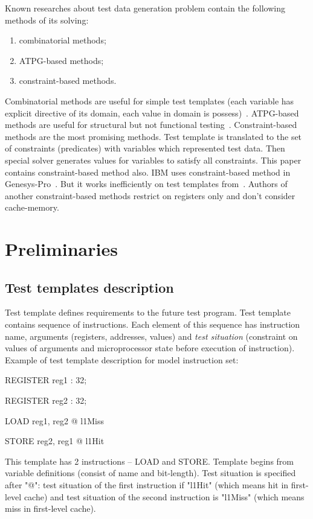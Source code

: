 \documentclass[times, 10pt,twocolumn]{article}
\begin{document}
Known researches about test data generation problem contain the
following methods of its solving:
\begin{enumerate}
\item combinatorial methods;
\item ATPG-based methods;
\item constraint-based methods.
\end{enumerate}

Combinatorial methods are useful for simple test templates (each
variable has explicit directive of its domain, each value in domain
is possess)~\cite{combinatorial}. ATPG-based methods are useful for
structural but not functional testing~\cite{ATPG}. Constraint-based
methods are the most promising methods. Test template is translated
to the set of constraints (predicates) with variables which
represented test data. Then special solver generates values for
variables to satisfy all constraints. This paper contains
constraint-based method also. IBM uses constraint-based method in
Genesys-Pro~\cite{GenesysPro}. But it works inefficiently on test
templates from~\cite{kamkin}. Authors of another constraint-based
methods restrict on registers only and don't consider cache-memory.

\section{Preliminaries}

\subsection{Test templates description}

Test template defines requirements to the future test program. Test
template contains sequence of instructions. Each element of this
sequence has instruction name, arguments (registers, addresses,
values) and \emph{test situation} (constraint on values of arguments and
microprocessor state before execution of instruction). Example of
test template description for model instruction set:

REGISTER reg1 : 32;

REGISTER reg2 : 32;

LOAD reg1, reg2 @ l1Miss

STORE reg2, reg1 @ l1Hit

This template has 2 instructions -- LOAD and STORE. Template
begins from variable definitions (consist of name and bit-length). Test situation is specified after "@": test situation
of the first instruction if "l1Hit" (which means hit in first-level cache) and test situation of the second instruction is "l1Miss" (which means miss in first-level cache).
\end{document}
